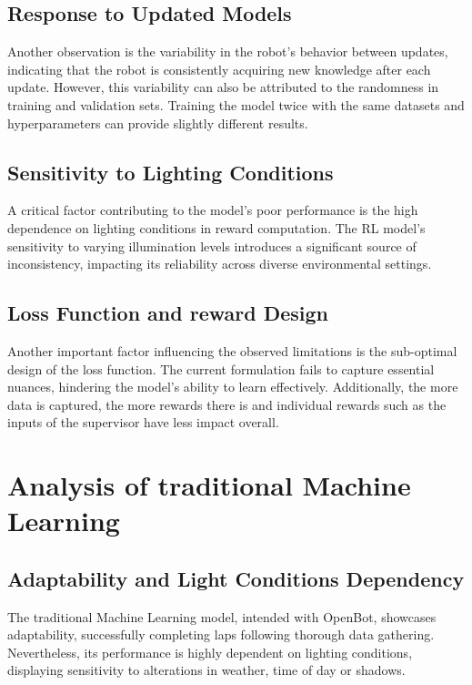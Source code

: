 \documentclass[12pt]{report}
\begin{document}
\subsection{Response to Updated Models}

Another observation is the variability in the robot's behavior between updates, indicating that the robot is consistently acquiring new knowledge after each update. However, this variability can also be attributed to the randomness in training and validation sets. Training the model twice with the same datasets and hyperparameters can provide slightly different results.

\subsection{Sensitivity to Lighting Conditions}

A critical factor contributing to the model's poor performance is the high dependence on lighting conditions in reward computation. The RL model's sensitivity to varying illumination levels introduces a significant source of inconsistency, impacting its reliability across diverse environmental settings.

\subsection{Loss Function and reward Design}

Another important factor influencing the observed limitations is the sub-optimal design of the loss function. The current formulation fails to capture essential nuances, hindering the model's ability to learn effectively. Additionally, the more data is captured, the more rewards there is and individual rewards such as the inputs of the supervisor have less impact overall. 

\section{Analysis of traditional Machine Learning}
\label{sub:analysis_ml}
\subsection{Adaptability and Light Conditions Dependency}
The traditional Machine Learning model, intended with OpenBot, showcases adaptability, successfully completing laps following thorough data gathering. Nevertheless, its performance is highly dependent on lighting conditions, displaying sensitivity to alterations in weather, time of day or shadows. 
\end{document}
